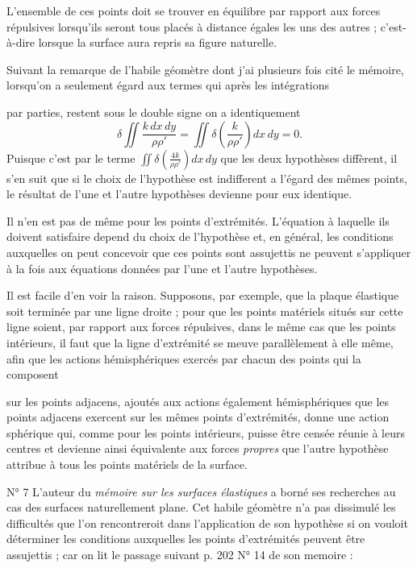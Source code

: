\documentclass[11pt,a4paper]{article}
\begin{document}
L'ensemble de ces points doit se trouver en équilibre par rapport aux forces
répulsives lorsqu'ils seront tous placés à distance égales les uns des
autres ; c'est-à-dire lorsque la surface aura repris sa figure naturelle.

Suivant la remarque de l'habile géomètre dont j'ai plusieurs fois cité le
mémoire, lorsqu'on a seulement égard aux termes qui après les intégrations

par parties, restent sous le double signe on a identiquement
\[
  \delta \iint \frac{k\, dx\, dy}{\rho\rho'}
  = \iint \delta\!\left( \frac{k}{\rho\rho'} \right) dx\, dy = 0 .
\]
Puisque c'est par le terme $\iint \delta\!\left( \frac{4k}{\rho\rho'} \right) dx\, dy$
que les deux hypothèses diffèrent, il s'en suit que si le choix de
l'hypothèse est indifferent a l'égard des mêmes points, le résultat de l'une
et l'autre hypothèses devienne pour eux identique.

Il n'en est pas de même pour les points d'extrémités. L'équation à laquelle
ils doivent satisfaire depend du choix de l'hypothèse et, en général, les
conditions auxquelles on peut concevoir que ces points sont assujettis ne
peuvent s'appliquer à la fois aux équations données par l'une et l'autre
hypothèses.

Il est facile d'en voir la raison. Supposons, par exemple, que la plaque
élastique soit terminée par une ligne droite ; pour que les points matériels
situés sur cette ligne soient, par rapport aux forces répulsives, dans le même
cas que les points intérieurs, il faut que la ligne d'extrémité se meuve
parallèlement à elle même, afin que les actions hémisphériques exercés par
chacun des points qui la composent

sur les points adjacens, ajoutés aux actions également hémisphériques que les
points adjacens exercent sur les mêmes points d'extrémités, donne
 une action sphérique qui, comme pour les points
intérieurs, puisse être censée réunie à leurs centres et devienne ainsi
équivalente aux forces \emph{propres} que l'autre hypothèse attribue à tous
les points matériels de la surface.

N° 7 L'auteur du \emph{mémoire sur les surfaces élastiques} a borné ses
recherches au cas des surfaces naturellement plane. Cet habile géomètre n'a
pas dissimulé les difficultés que l'on rencontreroit dans l'application de son
hypothèse si on vouloit déterminer les conditions auxquelles les points
d'extrémités peuvent être assujettis ; car on lit le passage suivant p. 202
N° 14 de son memoire :
\end{document}
